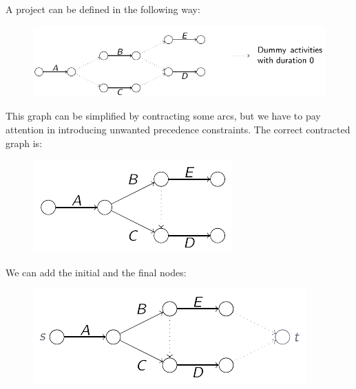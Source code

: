 \documentclass[12pt, a4paper]{report}
\newtheorem[style=M,bodystyle=\normalfont]{proposition}{Proposition}
\newtheorem[style=M,bodystyle=\normalfont]{theorem}{Theorem}
\newtheorem[style=M,bodystyle=\normalfont]{corollary}{Corollary}
\newtheorem[style=M,bodystyle=\normalfont]{lemma}{Lemma}
\newtheorem[style=M,bodystyle=\normalfont]{definition}{Definition}
\begin{document}
    \begin{example}
        A project can be defined in the following way: 
        \begin{figure}[H]
            \centering
            \includegraphics[width=0.8\linewidth]{images/project.png}
        \end{figure}
        This graph can be simplified by contracting some arcs, but we have to pay attention in introducing unwanted precedence constraints. The correct contracted graph is: 
        \begin{figure}[H]
            \centering
            \includegraphics[width=0.4\linewidth]{images/cproject.png}
        \end{figure}
        We can add the initial and the final nodes: 
        \begin{figure}[H]
            \centering
            \includegraphics[width=0.5\linewidth]{images/fproject.png}
        \end{figure}
    \end{example}
\end{document}
